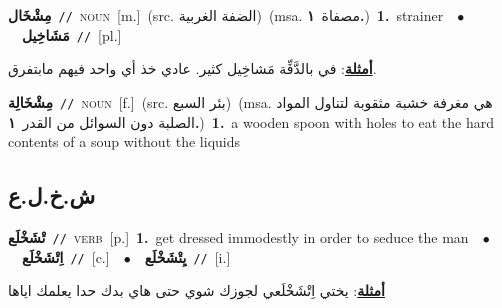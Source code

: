 \documentclass[10pt,a4paper,twoside]{article} %
\begin{document}
\begin{multicols}{2}
{\setlength\topsep{0pt}\textbf{\foreignlanguage{arabic}{مِشْخَال}}\ {\color{gray}\texttt{//}\color{black}}\ \textsc{noun}\ [m.]\ (src. \color{gray}\foreignlanguage{arabic}{الضفة الغربية}\color{black})\ \color{gray}(msa. \foreignlanguage{arabic}{مصفاة}~\foreignlanguage{arabic}{\textbf{١.}})\color{black}\ \textbf{1.}~strainer\ \ $\bullet$\ \ \setlength\topsep{0pt}\textbf{\foreignlanguage{arabic}{مَشَاخِيل}}\ {\color{gray}\texttt{//}\color{black}}\ [pl.]\  \begin{flushright}\color{gray}\foreignlanguage{arabic}{\textbf{\underline{\foreignlanguage{arabic}{أمثلة}}}: في بالدَّفِّة مَشاخِيل كثير. عادي خذ أي واحد فيهم مابتفرق.}\end{flushright}\color{black}} \vspace{2mm}

{\setlength\topsep{0pt}\textbf{\foreignlanguage{arabic}{مِشْخَالِة}}\ {\color{gray}\texttt{//}\color{black}}\ \textsc{noun}\ [f.]\ (src. \color{gray}\foreignlanguage{arabic}{بئر السبع}\color{black})\ \color{gray}(msa. \foreignlanguage{arabic}{هي مغرفة خشبة مثقوبة لتناول المواد الصلبة دون السوائل من القدر}~\foreignlanguage{arabic}{\textbf{١.}})\color{black}\ \textbf{1.}~a wooden spoon with holes to eat the hard contents of a soup without the liquids\ } \vspace{2mm}

\vspace{-3mm}
\subsection*{\color{blue}\foreignlanguage{arabic}{ش.خ.ل.ع}\color{blue}{}} 

{\setlength\topsep{0pt}\textbf{\foreignlanguage{arabic}{تْشَخْلَع}}\ {\color{gray}\texttt{//}\color{black}}\ \textsc{verb}\ [p.]\ \textbf{1.}~get dressed immodestly in order to seduce the man\ \ $\bullet$\ \ \setlength\topsep{0pt}\textbf{\foreignlanguage{arabic}{اِتْشَخْلَع}}\ {\color{gray}\texttt{//}\color{black}}\ [c.]\ \ $\bullet$\ \ \setlength\topsep{0pt}\textbf{\foreignlanguage{arabic}{يِتْشَخْلَع}}\ {\color{gray}\texttt{//}\color{black}}\ [i.]\  \begin{flushright}\color{gray}\foreignlanguage{arabic}{\textbf{\underline{\foreignlanguage{arabic}{أمثلة}}}: يختي اِتْشَخْلَعي لجوزك شوي حتى هاي بدك حدا يعلمك اياها}\end{flushright}\color{black}} \vspace{2mm}


\end{multicols}
\end{document}
